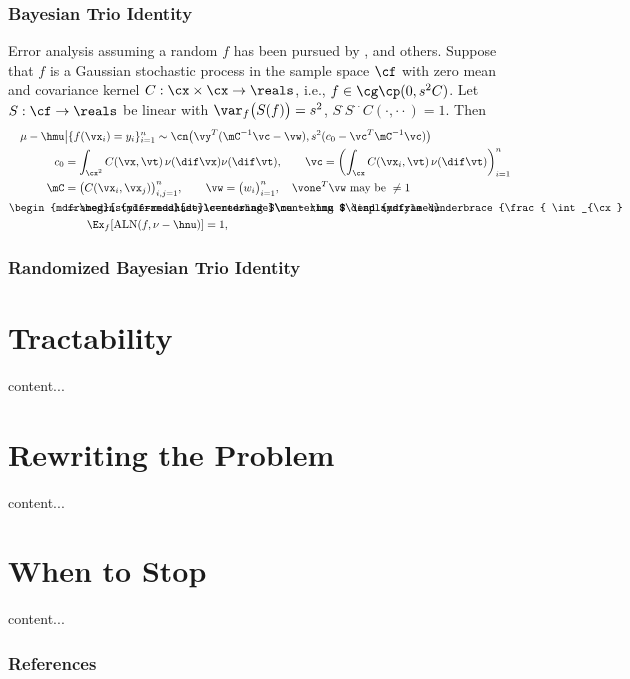 \documentclass[10pt,compress,xcolor={usenames,dvipsnames}]{beamer} %
\DeclareMathOperator{\algn}{ALN}
\DeclareMathOperator{\disc}{DSC}
\DeclareMathOperator{\Var}{VAR}
\DeclareMathOperator{\GP}{\cg\cp}
\newcommand{\redroundmathbox}[1]{\parbox{\widthof{$#1$\hspace{1em}}}
	{\begin{mdframed}[style=redshade]\centering $#1$ \end{mdframed}}}
\begin{document}
\begin{frame}
	\frametitle{Bayesian Trio Identity}
	\vspace*{-4ex}
	Error analysis assuming a random $f$ has been pursued by \cite{Dia88a}, \cite{Rit00a}  and others.
	Suppose that $f$ is a Gaussian stochastic process in the sample space $\cf$ with zero mean and covariance kernel $C:\cx \times \cx \to \reals$, i.e., $f \in \GP (0, s^2C)$.  Let $S : \cf \to \reals$ be linear with
	$ \var_{f}\bigl(S(f)\bigr)= s^2$, $S^{\cdot}S^{\cdot\cdot}C(\cdot,\cdot\cdot) =  1$.
	Then
	\begin{align*}
	 \mu - \hmu & \big \vert \{f(\vx_i )= y_i\}_{i=1}^n \sim \cn \bigl( \vy^T (\mC^{-1}\vc - \vw), s^2(c_0 - \vc ^T \mC^{-1} \vc) \bigr) \\
	 c_0 & = \int_{\cx^2} C(\vx,\vt) \, \nu(\dif \vx) \nu(\dif \vt), \qquad \vc = \biggl( \int_{\cx} C(\vx_i,\vt) \,\nu(\dif \vt) \biggr)_{i=1}^n \\
	 \mC & = \bigl( C(\vx_i,\vx_j) \bigr)_{i,j=1}^n, \qquad \vw = \bigl(w_i \bigr)_{i=1}^n,  \quad \vone^T \vw \text{ may be } \ne 1\\
	 \redroundmathbox{\mu - \hmu} 
	 & =  \redroundmathbox{\displaystyle%
	 	\underbrace{\frac{ \int_{\cx} f(\vx) \, (\nu - \hnu)(\dif\vx)}{\disc(\nu- \hnu) \Var(f)}}_{\textstyle \algn(f,\nu - \hnu)} \, 
	 	\underbrace{\sqrt{c_0 - 2 \vc^T \vw + \vw^T \mC \vw}}_{\textstyle\disc(\nu - \hnu)} \, \underbrace{s}_{\textstyle\Var(f)}}\\
	 & \qquad \Ex_f[\algn(f,\nu - \hnu)] = 1, \qquad 
	\end{align*}
	
	
	
	
\end{frame}

\begin{frame}
	\frametitle{Randomized Bayesian Trio Identity}
	
	
	
	
\end{frame}


\section{Tractability}

\begin{frame}
	content...
\end{frame}


\section{Rewriting the Problem}

\begin{frame}
	content...
\end{frame}


\section{When to Stop}
\begin{frame}
	content...
\end{frame}


\begin{frame}[allowframebreaks]\frametitle{References}
	
\end{frame}
\end{document}
